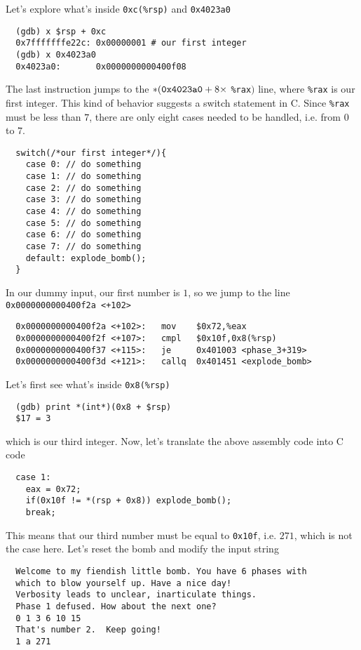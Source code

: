Let's explore what's inside \verb+0xc(%rsp)+ and \verb+0x4023a0+
\begin{verbatim}
  (gdb) x $rsp + 0xc
  0x7fffffffe22c: 0x00000001 # our first integer
  (gdb) x 0x4023a0
  0x4023a0:       0x0000000000400f08
\end{verbatim}
The last instruction jumps to the $*(\verb+0x4023a0+ + 8 \times$ \verb+%rax+$)$ line, where \verb+%rax+ is our first integer. This kind of behavior suggests a switch statement in C. Since \verb+%rax+ must be less than $7$, there are only eight cases needed to be handled, i.e. from $0$ to $7$.
\begin{verbatim}
  switch(/*our first integer*/){
    case 0: // do something
    case 1: // do something
    case 2: // do something
    case 3: // do something
    case 4: // do something
    case 5: // do something
    case 6: // do something
    case 7: // do something
    default: explode_bomb();
  }
\end{verbatim}
In our dummy input, our first number is $1$, so we jump to the line \verb|0x0000000000400f2a <+102>|
{\renewcommand\fcolorbox[4][]{\textcolor{cyan}{\strut#4}}
\begin{verbatim}
  0x0000000000400f2a <+102>:   mov    $0x72,%eax
  0x0000000000400f2f <+107>:   cmpl   $0x10f,0x8(%rsp)
  0x0000000000400f37 <+115>:   je     0x401003 <phase_3+319>
  0x0000000000400f3d <+121>:   callq  0x401451 <explode_bomb>
\end{verbatim}
}\noindent
Let's first see what's inside \verb+0x8(%rsp)+
\begin{verbatim}
  (gdb) print *(int*)(0x8 + $rsp)
  $17 = 3
\end{verbatim}
which is our third integer. Now, let's translate the above assembly code into C code
\begin{verbatim}
  case 1:
    eax = 0x72;
    if(0x10f != *(rsp + 0x8)) explode_bomb();
    break;
\end{verbatim}
This means that our third number must be equal to \verb+0x10f+, i.e. $271$, which is not the case here. Let's reset the bomb and modify the input string
{\renewcommand\fcolorbox[4][]{\textcolor{black}{\strut#4}}
\begin{verbatim}
  Welcome to my fiendish little bomb. You have 6 phases with
  which to blow yourself up. Have a nice day!
  Verbosity leads to unclear, inarticulate things.
  Phase 1 defused. How about the next one?
  0 1 3 6 10 15
  That's number 2.  Keep going!
  1 a 271
\end{verbatim}
}\noindent
